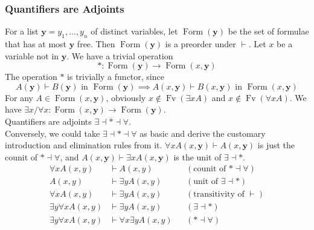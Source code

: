 \documentclass[UTF8,aspectratio=43,11pt,colorlinks,compress,openany]{beamer}%
\begin{document}
\begin{frame}\frametitle{Quantifiers are Adjoints}
\setlength\abovedisplayskip{0pt}
\setlength\belowdisplayskip{0pt}
For a list $\mathbf{y}=y_1,\dots,y_n$ of distinct variables, let $\operatorname{Form}(\mathbf{y})$ be the set of formulae that has at most $\mathbf{y}$ free. Then $\operatorname{Form}(\mathbf{y})$ is a preorder under $\vdash$. Let $x$ be a variable not in $\mathbf{y}$. We have a trivial operation
\[*:\operatorname{Form}(\mathbf{y})\to\operatorname{Form}(x,\mathbf{y})\]
The operation $*$ is trivially a functor, since
\[A(\mathbf{y})\vdash B(\mathbf{y}) \mbox{ in } \operatorname{Form}(\mathbf{y})\implies A(x,\mathbf{y})\vdash B(x,\mathbf{y}) \mbox{ in } \operatorname{Form}(x,\mathbf{y})\]
For any $A\in\operatorname{Form}(x,\mathbf{y})$, obviously $x\notin\operatorname{Fv}(\exists x A)$ and $x\notin\operatorname{Fv}(\forall x A)$. We have $\exists x/\forall x:\operatorname{Form}(x,\mathbf{y})\to\operatorname{Form}(\mathbf{y})$.\\
Quantifiers are adjoints $\exists\dashv *\dashv\forall$.\\
Conversely, we could take $\exists\dashv *\dashv\forall$ as basic and derive the customary introduction and elimination rules from it. $\forall xA(x,\mathbf{y})\vdash A(x,\mathbf{y})$ is just the counit of $*\dashv\forall$, and $A(x,\mathbf{y})\vdash\exists xA(x,\mathbf{y})$ is the unit of $\exists\dashv *$.
{\small \begin{align*}
	\forall x A(x,y)&\vdash A(x,y) &&(\mbox{counit of } *\dashv\forall)\\
	A(x,y)&\vdash\exists yA(x,y) &&(\mbox{unit of } \exists\dashv *)\\
	\forall xA(x,y)&\vdash\exists yA(x,y) &&(\mbox{transitivity of } \vdash)\\
	\exists y\forall xA(x,y)&\vdash \exists yA(x,y) &&(\exists\dashv*)\\
	\exists y\forall xA(x,y)&\vdash \forall x\exists yA(x,y) &&(*\dashv\forall)
\end{align*}}
\end{frame}
\end{document}
